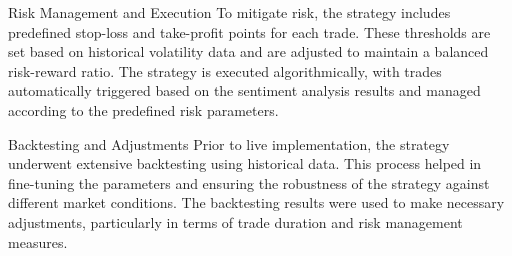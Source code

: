 Risk Management and Execution
To mitigate risk, the strategy includes predefined stop-loss and take-profit points for each trade. These thresholds are set based on historical volatility data and are adjusted to maintain a balanced risk-reward ratio. The strategy is executed algorithmically, with trades automatically triggered based on the sentiment analysis results and managed according to the predefined risk parameters.

Backtesting and Adjustments
Prior to live implementation, the strategy underwent extensive backtesting using historical data. This process helped in fine-tuning the parameters and ensuring the robustness of the strategy against different market conditions. The backtesting results were used to make necessary adjustments, particularly in terms of trade duration and risk management measures.